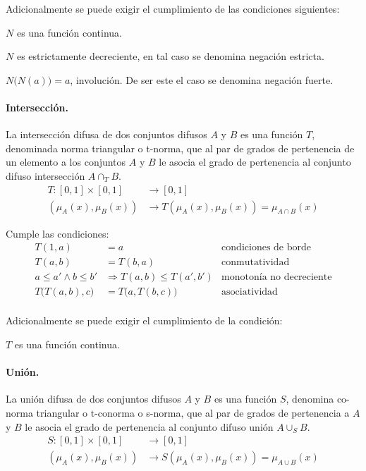 \documentclass[a5paper,doc,10pt,noapacite]{apa6}
\begin{document}
{{Adicionalmente se puede exigir el cumplimiento de las condiciones siguientes:
\begin{APAitemize}
    \item \(N\) es una función continua.
    \item \(N\) es estrictamente decreciente, en tal caso se denomina negación estricta.
    \item \(N\big(N(a)\big) = a\), involución. De ser este el caso se denomina negación fuerte.
\end{APAitemize}

\paragraph{Intersección.}
La intersección difusa de dos conjuntos difusos \(A\) y \(B\) es una función \(T\), denominada norma triangular o t-norma, que al par de grados de pertenencia de un elemento a los conjuntos \(A\) y \(B\) le asocia el grado de pertenencia al conjunto difuso intersección \(A \cap _T B\).
    \begin{align*}
    T: [0,1] \times [0,1] & \longrightarrow [0,1]\\
    (\mu _A(x), \mu _B(x)) & \longrightarrow T(\mu _A(x), \mu _B(x)) = \mu_{A\cap B} (x)
    \end{align*}

Cumple las condiciones:
\begin{align*}
	T(1,a) &= a 		&	\text{condiciones de borde}	\\
	T(a,b) &= T(b,a) 	&	\text{conmutatividad}			\\
	a \leq a' \wedge b \leq b' &\Rightarrow T(a,b) \leq T(a',b')	&	\text{monotonía no decreciente}			\\
	T\big(T(a,b),c\big) &= T\big(a, T(b,c)\big)	&		\text{asociatividad}			\\
\end{align*}

    
Adicionalmente se puede exigir el cumplimiento de la condición:

\begin{center}
	\(T\) es una función continua.
\end{center}

\paragraph{Unión.}

La unión difusa de dos conjuntos difusos \(A\) y \(B\) es una función \(S\), denomina co-norma triangular o t-conorma o s-norma, que al par de grados de pertenencia a \(A\) y \(B\) le asocia el grado de pertenencia al conjunto difuso unión  \(A \cup _S B\).
    \begin{align*}
    S: [0,1] \times [0,1] & \longrightarrow [0,1]\\
    (\mu _A(x), \mu _B(x)) & \longrightarrow S(\mu _A(x), \mu _B(x)) = \mu_{A\cup B} (x)
    \end{align*}

}}
\end{document}
